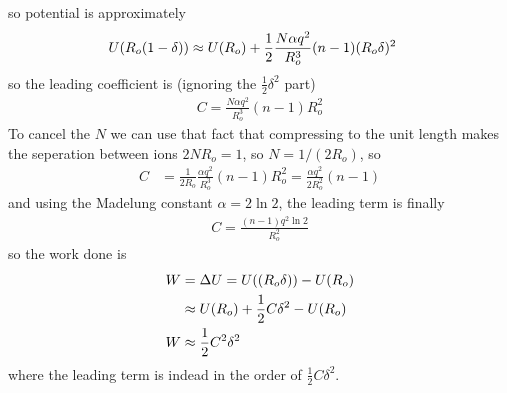 \documentclass[../main.tex]{subfiles}
\begin{document}
so potential is approximately
\begin{align*}
    U(R_o(1 - \delta)) &\approx U(R_o) + \frac{1}{2} \frac{N\alpha q^2}{R_o^3} (n - 1) (R_o\delta)^2
\end{align*}
so the leading coefficient is (ignoring the $\frac{1}{2}\delta^2$ part)
\begin{align*}
    C = \frac{N\alpha q^2}{R_o^3} (n - 1) R_o^2
\end{align*}
To cancel the $N$ we can use that fact that compressing to the unit length makes the seperation
between ions $2NR_o = 1$, so $N = 1/(2R_o)$, so
\begin{align*}
    C &= \frac{1}{2R_o} \frac{\alpha q^2}{R_o^3} (n - 1) R_o^2 = \frac{\alpha q^2}{2R_o^2} (n - 1)
\end{align*}
and using the Madelung constant $\alpha = 2\ln{2}$, the leading term is finally
\begin{align*}
    C = \frac{(n - 1)q^2 \ln{2}}{R_o^2} 
\end{align*}
so the work done is
\begin{align*}
    W &= \Delta U = U((R_o\delta)) - U(R_o) \\
    &\approx U(R_o) + \frac{1}{2} C \delta^2 - U(R_o) \\
    W &\approx \frac{1}{2} C^2 \delta^2
\end{align*}
where the leading term is indead in the order of $\frac{1}{2} C \delta^2$. 
\end{document}
